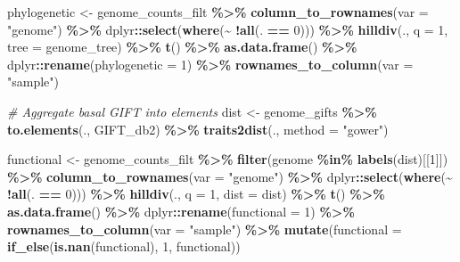\documentclass[
]{book}
\newenvironment{Shaded}{\begin{snugshade}}{\end{snugshade}}
\newcommand{\AttributeTok}[1]{\textcolor[rgb]{0.13,0.29,0.53}{#1}}
\newcommand{\CommentTok}[1]{\textcolor[rgb]{0.56,0.35,0.01}{\textit{#1}}}
\newcommand{\DecValTok}[1]{\textcolor[rgb]{0.00,0.00,0.81}{#1}}
\newcommand{\FunctionTok}[1]{\textcolor[rgb]{0.13,0.29,0.53}{\textbf{#1}}}
\newcommand{\NormalTok}[1]{#1}
\newcommand{\OtherTok}[1]{\textcolor[rgb]{0.56,0.35,0.01}{#1}}
\newcommand{\SpecialCharTok}[1]{\textcolor[rgb]{0.81,0.36,0.00}{\textbf{#1}}}
\newcommand{\StringTok}[1]{\textcolor[rgb]{0.31,0.60,0.02}{#1}}
\begin{document}
\begin{Shaded}
\begin{Highlighting}[]
\NormalTok{phylogenetic }\OtherTok{\textless{}{-}}\NormalTok{ genome\_counts\_filt }\SpecialCharTok{\%\textgreater{}\%}
  \FunctionTok{column\_to\_rownames}\NormalTok{(}\AttributeTok{var =} \StringTok{"genome"}\NormalTok{) }\SpecialCharTok{\%\textgreater{}\%}
\NormalTok{  dplyr}\SpecialCharTok{::}\FunctionTok{select}\NormalTok{(}\FunctionTok{where}\NormalTok{(}\SpecialCharTok{\textasciitilde{}} \SpecialCharTok{!}\FunctionTok{all}\NormalTok{(. }\SpecialCharTok{==} \DecValTok{0}\NormalTok{))) }\SpecialCharTok{\%\textgreater{}\%}
  \FunctionTok{hilldiv}\NormalTok{(., }\AttributeTok{q =} \DecValTok{1}\NormalTok{, }\AttributeTok{tree =}\NormalTok{ genome\_tree) }\SpecialCharTok{\%\textgreater{}\%}
  \FunctionTok{t}\NormalTok{() }\SpecialCharTok{\%\textgreater{}\%}
  \FunctionTok{as.data.frame}\NormalTok{() }\SpecialCharTok{\%\textgreater{}\%}
\NormalTok{  dplyr}\SpecialCharTok{::}\FunctionTok{rename}\NormalTok{(}\AttributeTok{phylogenetic =} \DecValTok{1}\NormalTok{) }\SpecialCharTok{\%\textgreater{}\%}
  \FunctionTok{rownames\_to\_column}\NormalTok{(}\AttributeTok{var =} \StringTok{"sample"}\NormalTok{)}

\CommentTok{\# Aggregate basal GIFT into elements}
\NormalTok{dist }\OtherTok{\textless{}{-}}\NormalTok{ genome\_gifts }\SpecialCharTok{\%\textgreater{}\%}
  \FunctionTok{to.elements}\NormalTok{(., GIFT\_db2) }\SpecialCharTok{\%\textgreater{}\%}
  \FunctionTok{traits2dist}\NormalTok{(., }\AttributeTok{method =} \StringTok{"gower"}\NormalTok{)}

\NormalTok{functional }\OtherTok{\textless{}{-}}\NormalTok{ genome\_counts\_filt }\SpecialCharTok{\%\textgreater{}\%}
  \FunctionTok{filter}\NormalTok{(genome }\SpecialCharTok{\%in\%} \FunctionTok{labels}\NormalTok{(dist)[[}\DecValTok{1}\NormalTok{]]) }\SpecialCharTok{\%\textgreater{}\%}
  \FunctionTok{column\_to\_rownames}\NormalTok{(}\AttributeTok{var =} \StringTok{"genome"}\NormalTok{) }\SpecialCharTok{\%\textgreater{}\%}
\NormalTok{  dplyr}\SpecialCharTok{::}\FunctionTok{select}\NormalTok{(}\FunctionTok{where}\NormalTok{(}\SpecialCharTok{\textasciitilde{}} \SpecialCharTok{!}\FunctionTok{all}\NormalTok{(. }\SpecialCharTok{==} \DecValTok{0}\NormalTok{))) }\SpecialCharTok{\%\textgreater{}\%}
  \FunctionTok{hilldiv}\NormalTok{(., }\AttributeTok{q =} \DecValTok{1}\NormalTok{, }\AttributeTok{dist =}\NormalTok{ dist) }\SpecialCharTok{\%\textgreater{}\%}
  \FunctionTok{t}\NormalTok{() }\SpecialCharTok{\%\textgreater{}\%}
  \FunctionTok{as.data.frame}\NormalTok{() }\SpecialCharTok{\%\textgreater{}\%}
\NormalTok{  dplyr}\SpecialCharTok{::}\FunctionTok{rename}\NormalTok{(}\AttributeTok{functional =} \DecValTok{1}\NormalTok{) }\SpecialCharTok{\%\textgreater{}\%}
  \FunctionTok{rownames\_to\_column}\NormalTok{(}\AttributeTok{var =} \StringTok{"sample"}\NormalTok{) }\SpecialCharTok{\%\textgreater{}\%}
  \FunctionTok{mutate}\NormalTok{(}\AttributeTok{functional =} \FunctionTok{if\_else}\NormalTok{(}\FunctionTok{is.nan}\NormalTok{(functional), }\DecValTok{1}\NormalTok{, functional))}


\end{Highlighting}
\end{Shaded}
\end{document}
